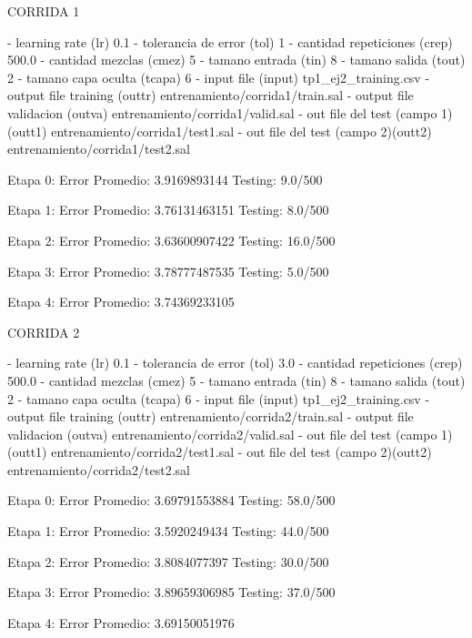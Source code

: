 CORRIDA 1

  - learning rate              (lr)         0.1
  - tolerancia de error        (tol)        1
  - cantidad repeticiones      (crep)       500.0
  - cantidad mezclas           (cmez)       5
  - tamano entrada             (tin)        8
  - tamano salida              (tout)       2
  - tamano capa oculta         (tcapa)      6
  - input file                 (input)      tp1_ej2_training.csv
  - output file training       (outtr)      entrenamiento/corrida1/train.sal
  - output file validacion     (outva)      entrenamiento/corrida1/valid.sal
  - out file del test (campo 1)(outt1)      entrenamiento/corrida1/test1.sal
  - out file del test (campo 2)(outt2)      entrenamiento/corrida1/test2.sal

Etapa 0:
      Error Promedio: 3.9169893144
      Testing: 9.0/500

Etapa 1:
      Error Promedio: 3.76131463151
      Testing: 8.0/500

Etapa 2:
      Error Promedio: 3.63600907422
      Testing: 16.0/500

Etapa 3:
      Error Promedio: 3.78777487535
      Testing: 5.0/500

Etapa 4:
      Error Promedio: 3.74369233105




CORRIDA 2

  - learning rate              (lr)         0.1
  - tolerancia de error        (tol)        3.0
  - cantidad repeticiones      (crep)       500.0
  - cantidad mezclas           (cmez)       5
  - tamano entrada             (tin)        8
  - tamano salida              (tout)       2
  - tamano capa oculta         (tcapa)      6
  - input file                 (input)      tp1_ej2_training.csv
  - output file training       (outtr)      entrenamiento/corrida2/train.sal
  - output file validacion     (outva)      entrenamiento/corrida2/valid.sal
  - out file del test (campo 1)(outt1)      entrenamiento/corrida2/test1.sal
  - out file del test (campo 2)(outt2)      entrenamiento/corrida2/test2.sal

Etapa 0:
      Error Promedio: 3.69791553884
      Testing: 58.0/500

Etapa 1:
      Error Promedio: 3.5920249434
      Testing: 44.0/500

Etapa 2:
      Error Promedio: 3.8084077397
      Testing: 30.0/500

Etapa 3:
      Error Promedio: 3.89659306985
      Testing: 37.0/500

Etapa 4:
      Error Promedio: 3.69150051976



